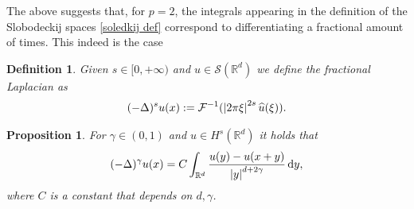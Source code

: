 \documentclass[
    a4paper,
    DIV=14,
    abstract=true,
    numbers=noenddot
]
{scrartcl}
\newtheorem{proposition}[theorem]{Proposition}
\newtheorem{definition}[theorem]{Definition}
\theoremstyle{definition}
\newcommand{\wh}[1]{\widehat{#1}}
\renewcommand{\d}{\,\mathrm{d}}\newcommand{\dx}{\,\mathrm{d}x}
\newcommand{\R}{\mathbb{R}}
\newcommand{\Ss}{\mathcal{S}}
\begin{document}
The above suggests that, for $p=2$, the integrals appearing in the definition of the Slobodeckij spaces \ref{soledkij def} correspond to differentiating a fractional amount of times. This indeed is the case
\begin{definition}
    Given $s \in [0,+\infty)$ and $u \in \Ss (\R^d)$ we define the fractional Laplacian as
    \begin{align*}
        (-\Delta )^{s }u(x):= \mathcal{F}^{-1}(\abs{2\pi\xi}^{2 s }\wh{u}(\xi )).
    \end{align*}
\end{definition}
\begin{proposition}
    For $\gamma  \in (0,1)$ and $u \in H^{s}(\R^d)$ it holds that
    \begin{align*}
        (-\Delta )^{\gamma }u(x)=C\int_{\R^d}\frac{u(y)-u(x+y)}{\abs{y}^{d+2\gamma}}\d y,
    \end{align*}
    where $C$ is a constant that depends on $d,\gamma $.
\end{proposition}
\end{document}
